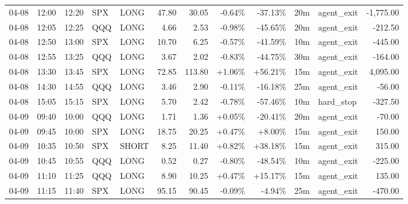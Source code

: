 \documentclass[11pt,a4paper]{article}
\begin{document}
\begin{center}
\begin{longtable}{>{\color{txtmain}}l l l l l r r r r r >{\color{txtmain}}l r}
04-08 & 12:00 & 12:20 & SPX & LONG & 47.80 & 30.05 & \textcolor{lossred}{-0.64\%} & \textcolor{lossred}{-37.13\%} & 20m & agent\_exit & \textcolor{lossred}{-1,775.00} \\
04-08 & 12:05 & 12:25 & QQQ & LONG & 4.66 & 2.53 & \textcolor{lossred}{-0.98\%} & \textcolor{lossred}{-45.65\%} & 20m & agent\_exit & \textcolor{lossred}{-212.50} \\
04-08 & 12:50 & 13:00 & SPX & LONG & 10.70 & 6.25 & \textcolor{lossred}{-0.57\%} & \textcolor{lossred}{-41.59\%} & 10m & agent\_exit & \textcolor{lossred}{-445.00} \\
04-08 & 12:55 & 13:25 & QQQ & LONG & 3.67 & 2.02 & \textcolor{lossred}{-0.83\%} & \textcolor{lossred}{-44.75\%} & 30m & agent\_exit & \textcolor{lossred}{-164.00} \\
04-08 & 13:30 & 13:45 & SPX & LONG & 72.85 & 113.80 & \textcolor{wingreen}{+1.06\%} & \textcolor{wingreen}{+56.21\%} & 15m & agent\_exit & \textcolor{wingreen}{4,095.00} \\
04-08 & 14:30 & 14:55 & QQQ & LONG & 3.46 & 2.90 & \textcolor{lossred}{-0.11\%} & \textcolor{lossred}{-16.18\%} & 25m & agent\_exit & \textcolor{lossred}{-56.00} \\
04-08 & 15:05 & 15:15 & SPX & LONG & 5.70 & 2.42 & \textcolor{lossred}{-0.78\%} & \textcolor{lossred}{-57.46\%} & 10m & hard\_stop & \textcolor{lossred}{-327.50} \\
04-09 & 09:40 & 10:00 & QQQ & LONG & 1.71 & 1.36 & \textcolor{wingreen}{+0.05\%} & \textcolor{lossred}{-20.41\%} & 20m & agent\_exit & \textcolor{lossred}{-70.00} \\
04-09 & 09:45 & 10:00 & SPX & LONG & 18.75 & 20.25 & \textcolor{wingreen}{+0.47\%} & \textcolor{wingreen}{+8.00\%} & 15m & agent\_exit & \textcolor{wingreen}{150.00} \\
04-09 & 10:35 & 10:50 & SPX & SHORT & 8.25 & 11.40 & \textcolor{wingreen}{+0.82\%} & \textcolor{wingreen}{+38.18\%} & 15m & agent\_exit & \textcolor{wingreen}{315.00} \\
04-09 & 10:45 & 10:55 & QQQ & LONG & 0.52 & 0.27 & \textcolor{lossred}{-0.80\%} & \textcolor{lossred}{-48.54\%} & 10m & agent\_exit & \textcolor{lossred}{-225.00} \\
04-09 & 11:10 & 11:25 & QQQ & LONG & 8.90 & 10.25 & \textcolor{wingreen}{+0.47\%} & \textcolor{wingreen}{+15.17\%} & 15m & agent\_exit & \textcolor{wingreen}{135.00} \\
04-09 & 11:15 & 11:40 & SPX & LONG & 95.15 & 90.45 & \textcolor{lossred}{-0.09\%} & \textcolor{lossred}{-4.94\%} & 25m & agent\_exit & \textcolor{lossred}{-470.00} \\

\end{longtable}
\end{center}
\end{document}
